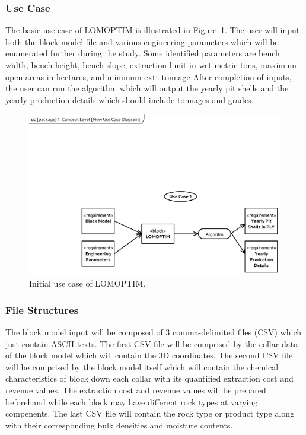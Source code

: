 \documentclass[12pt]{report}
\begin{document}
\subsubsection{Use Case}

The basic use case \cite{usecase} of LOMOPTIM is illustrated in Figure~\ref{fig:usecase}.
The user will input both the block model file and various engineering parameters which will be enumerated further during the study.
Some identified parameters are bench width, bench height, bench slope, extraction limit in wet metric tons, maximum open areas in hectares, and minimum extt tonnage
After completion of inputs, the user can run the algorithm which will output the yearly pit shells and the yearly production details which should include tonnages and grades.

\begin{figure}[p]
    \centering
    \includegraphics[clip, trim=15mm 0 0 12mm, width=\linewidth]{img/usecase.pdf}
    \caption{Initial use case of LOMOPTIM.}
    \label{fig:usecase}
\end{figure}

\subsubsection{File Structures}

The block model input will be composed of 3 comma-delimited files (CSV) which just contain ASCII texts.
The first CSV file will be comprised by the collar data of the block model which will contain the 3D coordinates.
The second CSV file will be comprised by the block model itself which will contain the chemical characteristics of block down each collar with its quantified extraction cost and revenue values.
The extraction cost and revenue values will be prepared beforehand while each block may have different rock types at varying compenents.
The last CSV file will contain the rock type or product type along with their corresponding bulk densities and moisture contents.
\end{document}

